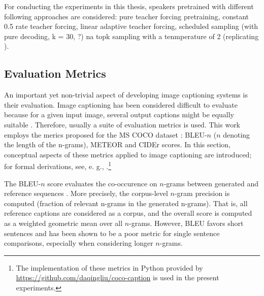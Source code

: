  For conducting the experiments in this thesis, speakers pretrained with different following approaches are considered: pure teacher forcing pretraining, constant 0.5 rate teacher forcing, linear adaptive teacher forcing, scheduled sampling (with pure decoding, k = 30, ?) na topk sampling with a tenmperature of 2 (replicating \cite{lazaridou2020multi}). 

\subsection{Evaluation Metrics}
\label{image_cap_metrics}
An important yet non-trivial aspect of developing image captioning systems is their evaluation. Image captioning has been considered difficult to evaluate because for a given input image, several output captions might be equally suitable . Therefore, usually a suite of evaluation metrics is used. This work employs the merics proposed for the MS COCO dataset \parencite{chen2015microsoft}: BLEU-$n$ ($n$ denoting the length of the n-grams), METEOR and CIDEr scores. In this section, conceptual aspects of these metrics applied to image captioning are introduced; for formal derivations, see, e. g., \cite{chen2015microsoft}.\footnote{The implementation of these metrics in Python provided by \url{https://github.com/daqingliu/coco-caption} is used in the present experiments.}

The BLEU-$n$ score evaluates the co-occurence on $n$-grams between generated and reference sequences \parencite{papineni2002bleu}. More precisely, the corpus-level $n$-gram precision is computed (fraction of relevant n-grams in the generated n-grams). That is, all reference captions are considered as a corpus, and the overall score is computed as a weighted geometric mean over all $n$-grams. However, BLEU favors short sentences and has been shown to be a poor metric for single sentence comparisons, especially when considering longer $n$-grams.


